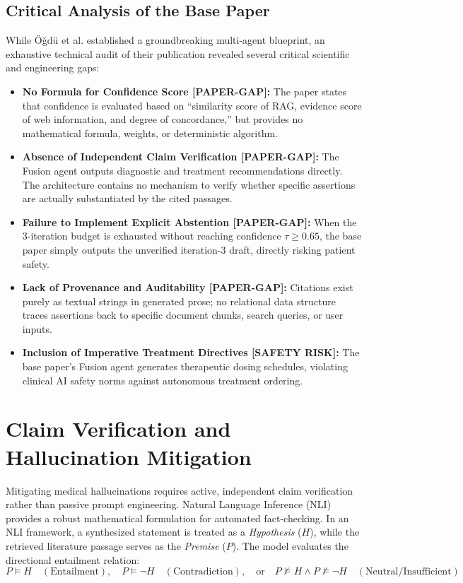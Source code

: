 \documentclass[12pt,a4paper]{report}
\begin{document}
\subsection{Critical Analysis of the Base Paper}
While Öğdü et al. established a groundbreaking multi-agent blueprint, an exhaustive technical audit of their publication revealed several critical scientific and engineering gaps:
\begin{itemize}
    \item \textbf{No Formula for Confidence Score [PAPER-GAP]:} The paper states that confidence is evaluated based on ``similarity score of RAG, evidence score of web information, and degree of concordance,'' but provides no mathematical formula, weights, or deterministic algorithm.
    \item \textbf{Absence of Independent Claim Verification [PAPER-GAP]:} The Fusion agent outputs diagnostic and treatment recommendations directly. The architecture contains no mechanism to verify whether specific assertions are actually substantiated by the cited passages.
    \item \textbf{Failure to Implement Explicit Abstention [PAPER-GAP]:} When the 3-iteration budget is exhausted without reaching confidence $\tau \ge 0.65$, the base paper simply outputs the unverified iteration-3 draft, directly risking patient safety.
    \item \textbf{Lack of Provenance and Auditability [PAPER-GAP]:} Citations exist purely as textual strings in generated prose; no relational data structure traces assertions back to specific document chunks, search queries, or user inputs.
    \item \textbf{Inclusion of Imperative Treatment Directives [SAFETY RISK]:} The base paper's Fusion agent generates therapeutic dosing schedules, violating clinical AI safety norms against autonomous treatment ordering.
\end{itemize}

\section{Claim Verification and Hallucination Mitigation}
Mitigating medical hallucinations requires active, independent claim verification rather than passive prompt engineering. Natural Language Inference (NLI) provides a robust mathematical formulation for automated fact-checking. In an NLI framework, a synthesized statement is treated as a \textit{Hypothesis} ($H$), while the retrieved literature passage serves as the \textit{Premise} ($P$). The model evaluates the directional entailment relation:
\begin{equation}
    P \models H \quad (\text{Entailment}), \quad P \models \neg H \quad (\text{Contradiction}), \quad \text{or} \quad P \not\models H \land P \not\models \neg H \quad (\text{Neutral/Insufficient})
\end{equation}
\end{document}
